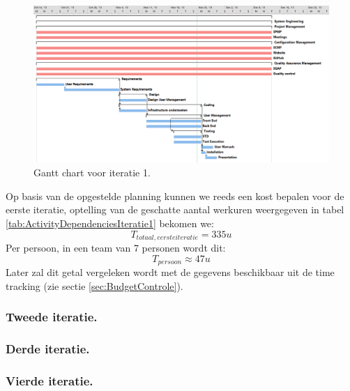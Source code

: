\begin{landscape}
	\begin{figure} [H]
		\centering
		\includegraphics[width = 1.35\textwidth]{ManagerialProcess/GanttChartIT1.png}	
		\caption{Gantt chart voor iteratie 1.}
		\label{fig:GantChartIT1}
	\end{figure}
\end{landscape}
Op basis van de opgestelde planning kunnen we reeds een kost bepalen voor de eerste iteratie, optelling van de geschatte aantal werkuren weergegeven in tabel \ref{tab:ActivityDependenciesIteratie1} bekomen we:
\begin{equation*}
	T_{totaal, eerste iteratie} = 335u
\end{equation*} 
Per persoon, in een team van 7 personen wordt dit:
\begin{equation*}
	T_{persoon} \approx 47u
\end{equation*}
Later zal dit getal vergeleken wordt met de gegevens beschikbaar uit de time tracking (zie sectie \ref{sec:BudgetControle}).
\subsubsection{Tweede iteratie.}

\subsubsection{Derde iteratie.}

\subsubsection{Vierde iteratie.}


